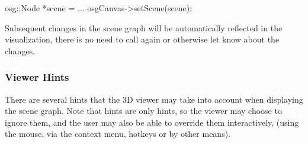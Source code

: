 \begin{cpp}
osg::Node *scene = ...
osgCanvas->setScene(scene);
\end{cpp}

Subsequent changes in the scene graph will be automatically reflected in
the visualization, there is no need to call  again or
otherwise let {\opp} know about the changes.


\subsubsection{Viewer Hints}
\label{sec:graphics:osgcanvas-viewer-hints}

There are several hints that the 3D viewer may take into account when displaying
the scene graph. Note that hints are only hints, so the viewer may choose to
ignore them, and the user may also be able to override them interactively,
(using the mouse, via the context menu, hotkeys or by other means).

